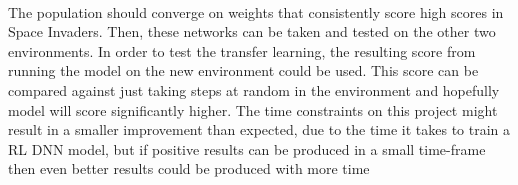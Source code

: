 \paragraph{}

The population should converge on weights that consistently score high scores in Space Invaders. Then, these networks can be taken and tested on the other two environments. In order to test the transfer learning, the resulting score from running the model on the new environment could be used. This score can be compared against just taking steps at random in the environment and hopefully model will score significantly higher. The time constraints on this project might result in a smaller improvement than expected, due to the time it takes to train a RL DNN model, but if positive results can be produced in a small time-frame then even better results could be produced with more time
